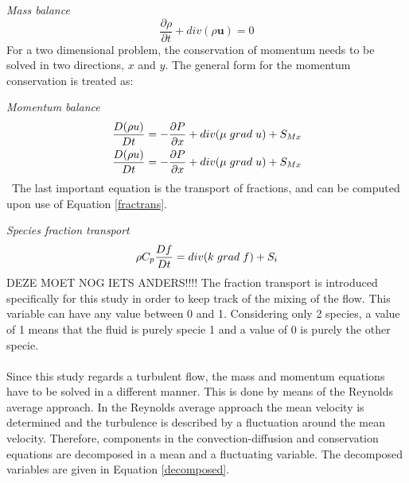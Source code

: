 \documentclass{CFD2017}
\begin{document}
\emph{Mass balance}
\begin{equation}
\label{MassBal}
\frac{\partial \rho }{\partial t} + div(\rho\mathbf u)= 0
\end{equation}
For a two dimensional problem, the conservation of momentum needs to be solved in two directions, $x$ and $y$. The general form for the momentum conservation is treated as:\vspace{2mm}

\emph{Momentum balance}
\begin{equation}
\begin{split}
\label{MomBal}
&\frac{D( \rho u) }{D t} =-\frac{\partial P}{\partial x} + div(\mu \hspace{1mm} grad\hspace{1mm}u)+S_{Mx}\\ 
&\frac{D( \rho u) }{D t} =-\frac{\partial P}{\partial x} + div(\mu \hspace{1mm} grad\hspace{1mm}u)+S_{Mx}
\end{split}
\end{equation}\
The last important equation is the transport of fractions, and can be computed upon use of Equation \ref{fractrans}.\vspace{2mm}

\emph{Species fraction transport}
\begin{equation}
\label{fractrans}
\rho C_p\frac{D f }{D t} = div(k \hspace{1mm}grad\hspace{1mm}f) +S_i 
\end{equation}
DEZE MOET NOG IETS ANDERS!!!!
The fraction transport is introduced specifically for this study in order to keep track of the mixing of the flow. This variable can have any value between 0 and 1. Considering only 2 species, a value of 1 means that the fluid is purely specie 1 and a value of 0 is purely the other specie. \\ \\
Since this study regards a turbulent flow, the mass and momentum equations have to be solved in a different manner. This is done by means of the Reynolds average approach. In the Reynolds average approach the mean velocity is determined and the turbulence is described by a fluctuation around the mean velocity. Therefore, components in the convection-diffusion and conservation equations are decomposed in a mean and a fluctuating variable. The decomposed variables are given in Equation \ref{decomposed}.\vspace{2mm}
\end{document}

